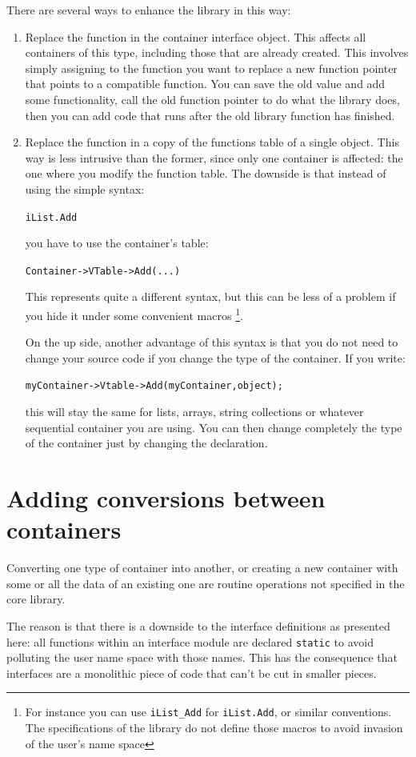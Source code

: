 \documentclass[12pt,a4paper]{memoir} %
\begin{document}
{{There are several ways to enhance the library in this way:
\begin{enumerate}
\item Replace the function in the container interface object. This affects all containers of this type, including those that are already created. This involves simply assigning to the function you want to replace a new function pointer that points to a compatible function. You can save the old value and add some functionality, call the old function pointer to do what the library does, then you can add code that runs after the old library function has finished.
\item Replace the function in a copy of the functions table of a single object. This way is less intrusive than the former, since only one container is affected: the one where you modify the function table. The downside is that instead of using the simple syntax:\par\noindent \texttt{iList.Add} \par you have to use the container's table:\par \texttt{Container->VTable->Add(...)} \par This represents quite a different syntax, but this can be less of a problem if you hide it under some convenient macros \footnote{For instance you can use \texttt{iList\_Add} for \texttt{iList.Add}, or similar conventions. The specifications of the library do not define those macros to avoid invasion of the user's name space}.

On the up side, another advantage of this syntax is that you do not need to change your source code if you change the type of the container. If you write: \par \noindent \texttt{myContainer->Vtable->Add(myContainer,object);}\par \noindent this will stay the same for lists, arrays, string collections or whatever sequential container you are using. You can then change completely the type of the container just by changing the declaration.
\end{enumerate}
\section{Adding conversions between containers}
Converting one type of container into another, or creating a new container with some or all the data of an existing one are routine operations not
specified in the core library.

The reason is that there is a downside to the interface definitions as presented here: all functions within an interface module are declared 
\verb,static, to avoid polluting the user name space with those names. This has the consequence that interfaces are a monolithic  piece of
code that can't be cut in smaller pieces.

}}
\end{document}
